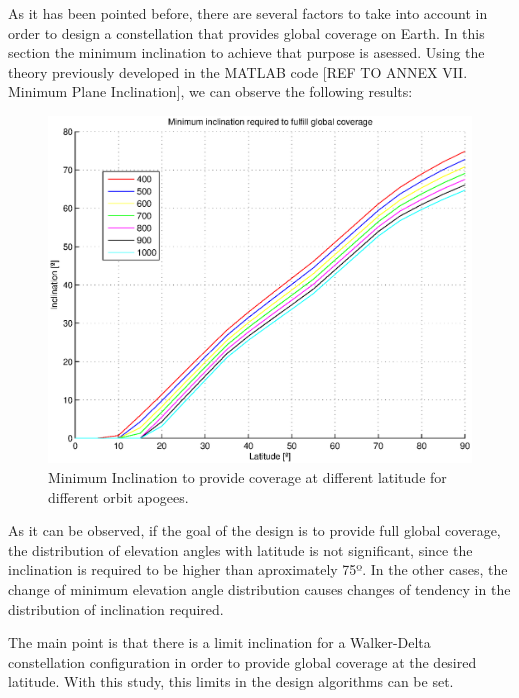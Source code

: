 As it has been pointed before, there are several factors to take into account in order to design a constellation that provides global coverage on Earth. In this section the minimum inclination to achieve that purpose is asessed. Using the theory previously developed in the MATLAB code [{REF TO ANNEX VII. Minimum Plane Inclination}], we can observe the following results:

\begin{figure}[H]
\includegraphics[scale=0.8]{MinimumInclinationPlot}
\caption{Minimum Inclination to provide coverage at different latitude for different orbit apogees.}	
\end{figure}

As it can be observed, if the goal of the design is to provide full global coverage, the distribution of elevation angles with latitude is not significant, since the inclination is required to be higher than aproximately 75º. In the other cases, the change of minimum elevation angle distribution causes changes of tendency in the distribution of inclination required. 

The main point is that there is a limit inclination for a Walker-Delta constellation configuration in order to provide global coverage at the desired latitude. With this study, this limits in the design algorithms can be set.